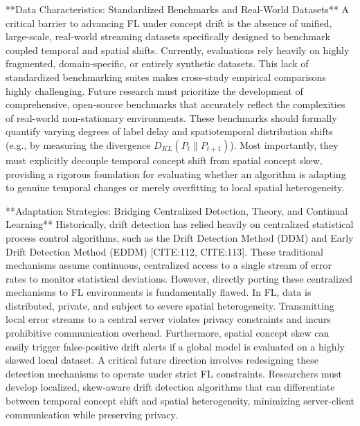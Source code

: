 \documentclass[journal]{IEEEtran}
\begin{document}
**Data Characteristics: Standardized Benchmarks and Real-World Datasets**
A critical barrier to advancing FL under concept drift is the absence of unified, large-scale, real-world streaming datasets specifically designed to benchmark coupled temporal and spatial shifts. Currently, evaluations rely heavily on highly fragmented, domain-specific, or entirely synthetic datasets. This lack of standardized benchmarking suites makes cross-study empirical comparisons highly challenging. Future research must prioritize the development of comprehensive, open-source benchmarks that accurately reflect the complexities of real-world non-stationary environments. These benchmarks should formally quantify varying degrees of label delay and spatiotemporal distribution shifts (e.g., by measuring the divergence $D_{KL}(P_t \parallel P_{t+1})$). Most importantly, they must explicitly decouple temporal concept shift from spatial concept skew, providing a rigorous foundation for evaluating whether an algorithm is adapting to genuine temporal changes or merely overfitting to local spatial heterogeneity.

**Adaptation Strategies: Bridging Centralized Detection, Theory, and Continual Learning**
Historically, drift detection has relied heavily on centralized statistical process control algorithms, such as the Drift Detection Method (DDM) and Early Drift Detection Method (EDDM) [CITE:112, CITE:113]. These traditional mechanisms assume continuous, centralized access to a single stream of error rates to monitor statistical deviations. However, directly porting these centralized mechanisms to FL environments is fundamentally flawed. In FL, data is distributed, private, and subject to severe spatial heterogeneity. Transmitting local error streams to a central server violates privacy constraints and incurs prohibitive communication overhead. Furthermore, spatial concept skew can easily trigger false-positive drift alerts if a global model is evaluated on a highly skewed local dataset. A critical future direction involves redesigning these detection mechanisms to operate under strict FL constraints. Researchers must develop localized, skew-aware drift detection algorithms that can differentiate between temporal concept shift and spatial heterogeneity, minimizing server-client communication while preserving privacy.
\end{document}
